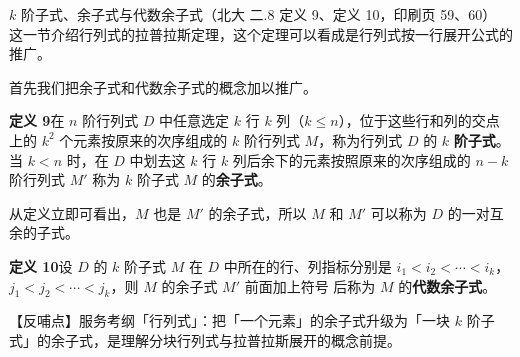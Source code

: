 \begin{fdeep}{$k$ 阶子式、余子式与代数余子式（北大 二.8 定义 9、定义 10，印刷页 59、60）}
这一节介绍行列式的拉普拉斯定理，这个定理可以看成是行列式按一行展开公式的推广。

首先我们把余子式和代数余子式的概念加以推广。

\textbf{定义 9}\quad 在 $n$ 阶行列式 $D$ 中任意选定 $k$ 行 $k$ 列（$k\le n$），位于这些行和列的交点上的 $k^2$ 个元素按原来的次序组成的 $k$ 阶行列式 $M$，称为行列式 $D$ 的 $k$ \textbf{阶子式}。当 $k<n$ 时，在 $D$ 中划去这 $k$ 行 $k$ 列后余下的元素按照原来的次序组成的 $n-k$ 阶行列式 $M'$ 称为 $k$ 阶子式 $M$ 的\textbf{余子式}。

从定义立即可看出，$M$ 也是 $M'$ 的余子式，所以 $M$ 和 $M'$ 可以称为 $D$ 的一对互余的子式。

\textbf{定义 10}\quad 设 $D$ 的 $k$ 阶子式 $M$ 在 $D$ 中所在的行、列指标分别是 $i_1<i_2<\cdots<i_k$，$j_1<j_2<\cdots<j_k$，则 $M$ 的余子式 $M'$ 前面加上符号
后称为 $M$ 的\textbf{代数余子式}。

【反哺点】服务考纲「行列式」：把「一个元素」的余子式升级为「一块 $k$ 阶子式」的余子式，是理解分块行列式与拉普拉斯展开的概念前提。
\end{fdeep}

